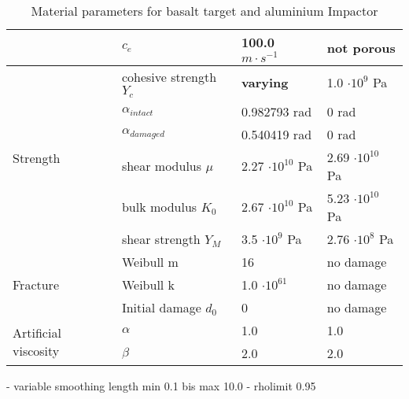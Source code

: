 \begin{table}
\begin{tabular}{ |l|l|l|l| }
                                              & $c_e$                   & 100.0 $m\cdot s^{-1}$            & not porous                       \\ \hline
        \multirow{6}{*}{Strength}             & cohesive strength $Y_c$ & \textbf{varying}                 & 1.0 $\cdot 10^9$ Pa              \\
                                              & $\alpha_{intact}$       & 0.982793 rad                     & 0 rad                            \\
                                              & $\alpha_{damaged}$      & 0.540419 rad                     & 0 rad                            \\
                                              & shear modulus $\mu$     & 2.27 $\cdot 10^{10}$ Pa          & 2.69 $\cdot 10^{10}$ Pa          \\
                                              & bulk modulus $K_0$      & 2.67 $\cdot 10^{10}$ Pa          & 5.23 $\cdot 10^{10}$ Pa          \\
                                              & shear strength $Y_M$    & 3.5 $\cdot 10^9$ Pa              & 2.76 $\cdot 10^8$ Pa             \\ \hline
        \multirow{3}{*}{Fracture}             & Weibull m               & 16                               & no damage                        \\
                                              & Weibull k               & 1.0 $\cdot 10^{61}$              & no damage                        \\
                                              & Initial damage $d_0$    & 0                                & no damage                        \\  \hline
        \multirow{2}{*}{Artificial viscosity} & $\alpha$                & 1.0                              & 1.0                              \\
                                              & $\beta$                 & 2.0                              & 2.0                              \\ \hline
        \hline
    \end{tabular}
    \caption{Material parameters for basalt target and aluminium Impactor}
    \label{tab:material_parameters}
\end{table}

- variable smoothing length min 0.1 bis max 10.0
- rholimit 0.95